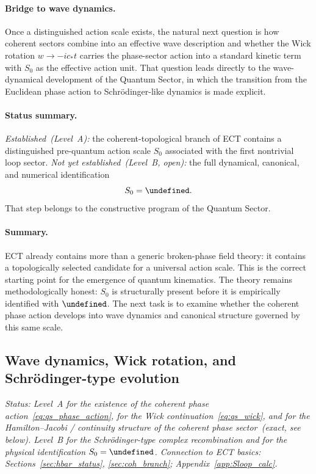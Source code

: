 \documentclass[11pt,a4paper]{article}
\let\hbar\undefined
\numberwithin{equation}{section}
\begin{document}
\paragraph{Bridge to wave dynamics.}
Once a distinguished action scale exists, the natural next question is
how coherent sectors combine into an effective wave description and
whether the Wick rotation $w\to -ic_*t$ carries the phase-sector
action into a standard kinetic term with $S_0$ as the effective
action unit.
That question leads directly to the wave-dynamical development of the
Quantum Sector, in which the transition from the Euclidean phase action
to Schr\"odinger-like dynamics is made explicit.

\paragraph{Status summary.}
\textit{Established~(Level~A):}
the coherent-topological branch of ECT contains a distinguished
pre-quantum action scale $S_0$ associated with the first nontrivial
loop sector.
\textit{Not yet established~(Level~B, open):}
the full dynamical, canonical, and numerical identification
\begin{equation}
  S_0 = \hbar .
  \label{eq:qs_S0_identification}
\end{equation}
That step belongs to the constructive program of the Quantum Sector.

\paragraph{Summary.}
ECT already contains more than a generic broken-phase field theory:
it contains a topologically selected candidate for a universal action
scale.
This is the correct starting point for the emergence of quantum
kinematics.
The theory remains methodologically honest: $S_0$ is structurally
present before it is empirically identified with $\hbar$.
The next task is to examine whether the coherent phase action develops
into wave dynamics and canonical structure governed by this same scale.

\subsection{Wave dynamics, Wick rotation, and
  Schr\"odinger-type evolution}
\label{sec:qs_wave}

\textit{Status: Level~A for the existence of the coherent phase
action~\eqref{eq:qs_phase_action}, for the Wick
continuation~\eqref{eq:qs_wick}, and for the Hamilton--Jacobi /
continuity structure of the coherent phase sector~(exact, see below).
Level~B for the Schr\"odinger-type complex recombination and for the
physical identification $S_0=\hbar$.
Connection to ECT basics: Sections~\ref{sec:hbar_status},
\ref{sec:coh_branch}; Appendix~\ref{app:Sloop_calc}.}
\end{document}
